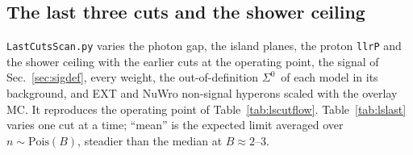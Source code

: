 \documentclass[11pt,a4paper]{article}
\newcommand{\Szero}{\ensuremath{\Sigma^{0}}}
\begin{document}
\subsection{The last three cuts and the shower ceiling}
\label{app:lslast}
\texttt{LastCutsScan.py} varies the photon gap, the island planes, the proton \texttt{llrP} and
the shower ceiling with the earlier cuts at the operating point, the signal of
Sec.~\ref{sec:sigdef}, every weight, the out-of-definition \Szero\ of each model in its
background, and EXT and NuWro non-signal hyperons scaled with the overlay MC. It reproduces the
operating point of Table~\ref{tab:lscutflow}. Table~\ref{tab:lslast} varies one cut at a time;
``mean'' is the expected limit averaged over $n\sim\mathrm{Pois}(B)$, steadier than the median
at $B\approx2$--$3$.
\end{document}

